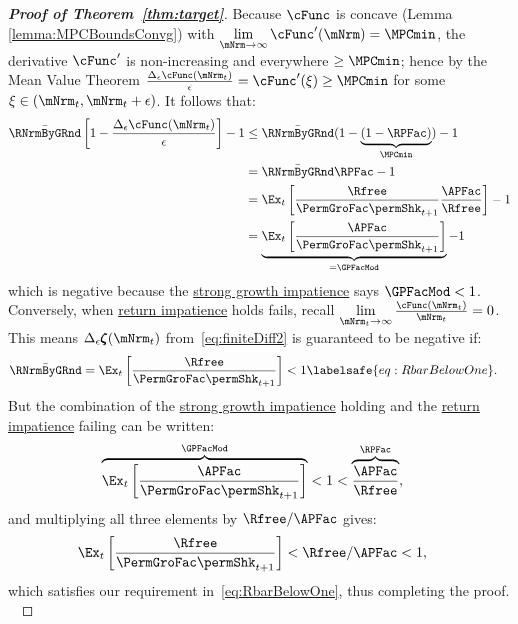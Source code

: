 \documentclass[\econtexRoot/BufferStockTheory]{subfiles}
\begin{document}
\begin{proof}[\textbf{Proof of Theorem~\ref{thm:target}}]
Because $\cFunc$ is concave (Lemma \ref{lemma:MPCBoundsConvg}) with $\lim\limits_{\mNrm\rightarrow\infty}\cFunc^{\prime}(\mNrm)=\MPCmin$, the derivative $\cFunc^{\prime}$ is non-increasing and everywhere $\geq\MPCmin$; hence by the Mean Value Theorem $\frac{\Delta_{\epsilon}\cFunc(\mNrm_{t})}{\epsilon}=\cFunc^{\prime}(\xi)\geq\MPCmin$ for some $\xi\in(\mNrm_t,\mNrm_t+\epsilon)$.
%
It follows that:
%
\begin{align*}
  \bar{\RNrmByGRnd}\left[1-\frac{\Delta_{\epsilon}\cFunc({\mNrm}_t)}{\epsilon}\right]- 1 & \leq  \bar{\RNrmByGRnd}(1-\underbrace{(1-\RPFac)}_{\MPCmin}) - 1  \\
                                                            & = \bar{\RNrmByGRnd}\RPFac - 1 \\
                                                            & = \Ex_{t}\left[\frac{\Rfree}{\PermGroFac \permShk_{t+1}}\frac{\APFac}{\Rfree}\right] - 1 \\
                                                            & = \underbrace{\Ex_{t}\left[\frac{\APFac}{\PermGroFac \permShk_{t+1}}\right]}_{= \GPFacMod} - 1 
\end{align*}
%
which is negative because the \hyperlink{GICMod}{strong growth impatience} says $\GPFacMod < 1$.
Conversely, when \hyperlink{RIC}{return impatience} holds fails, recall $\lim\limits_{\mNrm_{t} \rightarrow \infty} \frac{\cFunc(\mNrm_{t})}{\mNrm_{t}} = 0$.
This means $ \Delta_{\epsilon}\difFunc(\mNrm_{t})$ from~\eqref{eq:finiteDiff2} is guaranteed to be negative if:
%
\begin{equation}\begin{gathered}\begin{aligned}
  \bar{\RNrmByGRnd} = \Ex_{t}\left[\frac{\Rfree}{\PermGroFac \permShk_{t+1}}\right] & < 1  \labelsafe{eq:RbarBelowOne}.
\end{aligned}\end{gathered}\end{equation}
%
But the combination of the \hyperlink{GICMod}{strong growth impatience} holding and the \hyperlink{RIC}{return impatience} failing can be written:
%
\begin{equation}\begin{gathered}\begin{aligned}\label{eq:GICStrRICfailst1}
  \overbrace{\Ex_{t}\left[\frac{\APFac}{\PermGroFac \permShk_{t+1}}\right]}^{\GPFacMod} & < 1 < \overbrace{\frac{\APFac}{\Rfree}}^{{\RPFac}},
\end{aligned}\end{gathered}\end{equation}
%
and multiplying all three elements by $\Rfree/\APFac$ gives:
%
\begin{equation}\begin{gathered}\begin{aligned}\label{eq:GICStrRICfailst2}
  \Ex_{t}\left[\frac{\Rfree}{\PermGroFac \permShk_{t+1}}\right] & < \Rfree/\APFac < 1,
\end{aligned}\end{gathered}\end{equation}
%
which satisfies our requirement in~\eqref{eq:RbarBelowOne}, thus completing the proof.
\


\end{proof}
\end{document}
